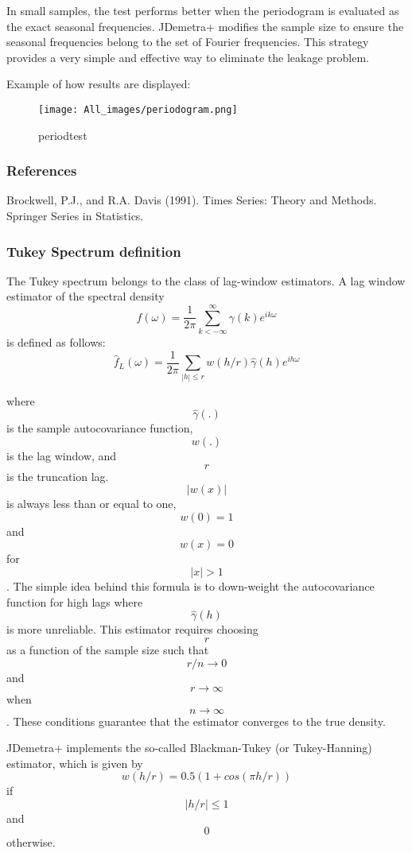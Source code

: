 \documentclass[
]{book}
\begin{document}
In small samples, the test performs better when the periodogram is evaluated as the exact seasonal frequencies. JDemetra+ modifies the sample size
to ensure the seasonal frequencies belong to the set of Fourier frequencies. This strategy provides a very simple and effective way to eliminate the leakage problem.

Example of how results are displayed:

\begin{figure}
\centering
\texttt{[image: All\_images/periodogram.png]}
\caption{periodtest}
\end{figure}

\hypertarget{references-4}{%
\subsubsection{References}\label{references-4}}

Brockwell, P.J., and R.A. Davis (1991). Times Series: Theory and Methods. Springer Series in Statistics.

\hypertarget{tukey-spectrum-definition}{%
\subsubsection{Tukey Spectrum definition}\label{tukey-spectrum-definition}}

The Tukey spectrum belongs to the class of lag-window estimators. A lag window estimator of the spectral density
\[
f(\omega)=\frac{1}{2\pi}\sum_{k<-\infty}^{\infty}\gamma(k)e^{i k \omega}
\]
is defined as follows:
\[
\hat{f}_{L}(\omega)=\frac{1}{2\pi}\sum_{\left| h \right| \leq r } w(h/r)\hat{\gamma}(h)e^{i h \omega}
\]

where \[\hat{\gamma}(.) \] is the sample autocovariance function, \[w(.)\] is the lag window, and \[r\] is the
truncation lag. \[\left| w(x)\right| \] is always less than or equal to one, \[w(0)=1\] and \[w(x)=0\] for \[\left| x \right| > 1\]. The
simple idea behind this formula is to down-weight the autocovariance function for high lags where \[\hat{\gamma}(h)\] is more unreliable. This estimator
requires choosing \[r\] as a function of the sample size such that \[r/n \rightarrow 0 \] and \[r\rightarrow \infty \] when \[ n \rightarrow \infty \] .
These conditions guarantee that the estimator converges to the true density.

JDemetra+ implements the so-called Blackman-Tukey (or Tukey-Hanning) estimator, which is given
by \[w(h/r)=0.5(1+cos(\pi h/r))\] if \[\left| h/r \right| \leq 1\] and \[0\] otherwise.
\end{document}
